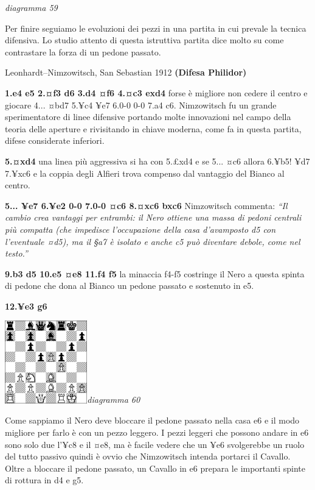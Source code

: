 \documentclass[
]{article}
\begin{document}
\emph{diagramma 59}

Per finire seguiamo le evoluzioni dei pezzi in una partita in cui
prevale la tecnica difensiva. Lo studio attento di questa istruttiva
partita dice molto su come contrastare la forza di un pedone passato.

Leonhardt--Nimzowitsch, San Sebastian 1912 \textbf{(Difesa Philidor)}

\textbf{1.e4 e5 2.¤f3 d6 3.d4 ¤f6 4.¤c3 exd4} forse è migliore non
cedere il centro e giocare 4... ¤bd7 5.¥c4 ¥e7 6.0-0 0-0 7.a4 c6.
Nimzowitsch fu un grande sperimentatore di linee difensive portando
molte innovazioni nel campo della teoria delle aperture e rivisitando in
chiave moderna, come fa in questa partita, difese considerate inferiori.

\textbf{5.¤xd4} una linea più aggressiva si ha con 5.£xd4 e se 5... ¤c6
allora 6.¥b5! ¥d7 7.¥xc6 e la coppia degli Alfieri trova compenso dal
vantaggio del Bianco al centro.

\textbf{5... ¥e7 6.¥e2 0-0 7.0-0 ¤c6 8.¤xc6 bxc6} Nimzowitsch commenta:
\emph{``Il cambio crea vantaggi per entrambi: il Nero ottiene una massa
di pedoni centrali più compatta (che impedisce l'occupazione della casa
d'avamposto d5 con l'eventuale ¤d5), ma il §a7 è isolato e anche c5 può
diventare debole, come nel testo.''}

\textbf{9.b3 d5 10.e5 ¤e8 11.f4 f5} la minaccia f4-f5 costringe il Nero
a questa spinta di pedone che dona al Bianco un pedone passato e
sostenuto in e5.

\textbf{12.¥e3 g6}

\includegraphics[width=1.40972in,height=1.40972in]{vertopal_109f12be458a423d8f3cc838880eaea2/media/image60.png}\emph{diagramma
60}

Come sappiamo il Nero deve bloccare il pedone passato nella casa e6 e il
modo migliore per farlo è con un pezzo leggero. I pezzi leggeri che
possono andare in e6 sono solo due l'¥c8 e il ¤e8, ma è facile vedere
che un ¥e6 svolgerebbe un ruolo del tutto passivo quindi è ovvio che
Nimzowitsch intenda portarci il Cavallo. Oltre a bloccare il pedone
passato, un Cavallo in e6 prepara le importanti spinte di rottura in d4
e g5.
\end{document}
